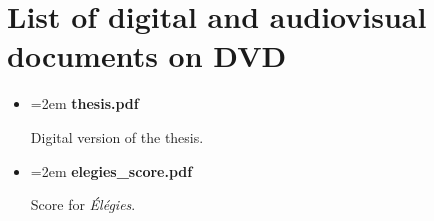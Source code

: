 \documentclass[12pt,twoside,maitrise]{dms_ks}
\theoremstyle{definition}
\begin{document}
{%
\printbibliography


\appendix
\chapter{List of digital and audiovisual documents on DVD}


\begin{itemize}
    \setlength\itemsep{0.5em}  %
    \setlength\parskip{0pt}    %
    \setlength\parsep{0pt}
    \setlength\leftskip{0pt}   %
    \setlength{\labelsep}{0pt} %
    \renewcommand{\labelitemi}{} %
    \renewcommand{\labelitemii}{} %

    \item \hangindent=2em \textbf{thesis.pdf}
    \par Digital version of the thesis.
     
    \item \hangindent=2em \textbf{elegies\_score.pdf}
    \par Score for \textit{Élégies}.
    

\end{itemize}}
\end{document}

